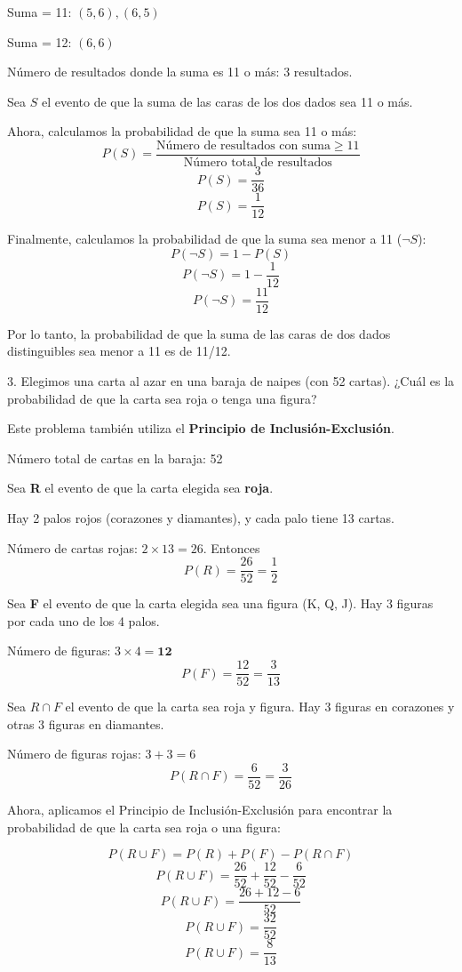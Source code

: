 Suma = 11: $(5, 6), (6, 5)$

Suma = 12: $(6, 6)$

Número de resultados donde la suma es 11 o más: 3 resultados.

Sea $S$ el evento de que la suma de las caras de los dos dados sea 11 o más.

Ahora, calculamos la probabilidad de que la suma sea 11 o más:
$$P(S) = \frac{\text{Número de resultados con suma} \geq 11}{\text{Número total de resultados}}$$
$$P(S) = \frac{3}{36}$$
$$P(S) = \frac{1}{12}$$

Finalmente, calculamos la probabilidad de que la suma sea menor a 11 ($\lnot  S$):
$$P(\lnot S) = 1 - P(S)$$
$$P(\lnot S) = 1 - \frac{1}{12}$$
$$P(\lnot S) = \frac{11}{12}$$

Por lo tanto, la probabilidad de que la suma de las caras de dos dados distinguibles 
sea menor a 11 es de 11/12.

\newpage

3. Elegimos una carta al azar en una baraja de naipes (con 52 cartas). 
¿Cuál es la probabilidad de que la carta sea roja o tenga una figura?

Este problema también utiliza el \textbf{Principio de Inclusión-Exclusión}.

Número total de cartas en la baraja: 52

Sea \textbf{R} el evento de que la carta elegida sea \textbf{roja}.

Hay 2 palos rojos (corazones y diamantes), y cada palo tiene 13 cartas.

Número de cartas rojas: $2 \times 13 = 26$. Entonces
$$P(R) = \frac{26}{52} = \frac{1}{2}$$

Sea \textbf{F} el evento de que la carta elegida sea una figura 
(K, Q, J). Hay 3 figuras por cada uno de los 4 palos.

Número de figuras: $3 \times 4 = \textbf{12}$
$$P(F) = \frac{12}{52} = \frac{3}{13}$$

Sea $R \cap F$ el evento de que la carta sea roja y figura. Hay 3 figuras en 
corazones y otras 3 figuras en diamantes.

Número de figuras rojas: $3 + 3 = 6$
$$P(R \cap F) = \frac{6}{52} = \frac{3}{26}$$

Ahora, aplicamos el Principio de Inclusión-Exclusión para encontrar la probabilidad de 
que la carta sea roja o una figura:

$$P(R \cup F) = P(R) + P(F) - P(R \cap F)$$
$$P(R \cup F) = \frac{26}{52} + \frac{12}{52} - \frac{6}{52}$$
$$P(R \cup F) = \frac{26 + 12 - 6}{52}$$
$$P(R \cup F) = \frac{32}{52}$$
$$P(R \cup F) = \frac{8}{13}$$

